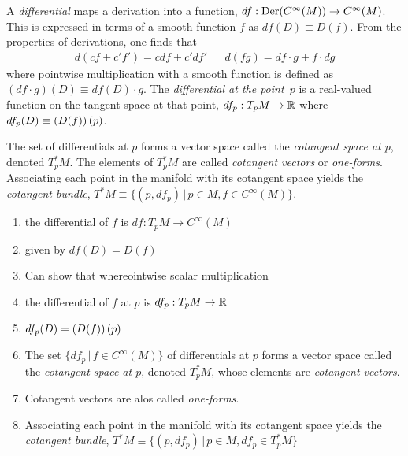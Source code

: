\documentclass[11pt]{article}
\numberwithin{equation}{section}
\begin{document}
\begin{dfn}
A \textit{differential} maps a derivation into a function, 
$
  df
:
  \mathrm{Der}(C^\infty(M))
\rightarrow
  C^\infty(M)
$.
This is expressed in terms of a smooth function $f$ as
$
  df(D)
\equiv
  D(f)
$.
From the properties of derivations, one finds that
\begin{align}
  d(cf + c'f')
=
  cdf
+
  c'df'
&&
  d(fg)
=
  df\cdot g
+
  f\cdot dg
\end{align}
where pointwise multiplication with a smooth function is defined as
$
  (df\cdot g)(D)
\equiv
  df(D)\cdot g
$.
The \textit{differential at the point~$p$}
is a real-valued function on the tangent space at that point,
$
  df_p
:
  T_pM
\rightarrow
  \mathbb{R}
$
where
$
  df_p(D)
\equiv
  \left(D(f)\right)(p)
$.
\end{dfn}

\begin{dfn}
The set of differentials at $p$ forms a vector space called the \textit{cotangent space at $p$}, denoted
$
  T_p^*M
$.
The elements of $T_p^*M$ are called \textit{cotangent vectors} or \textit{one-forms}.
Associating each point in the manifold with its cotangent space yields the \textit{cotangent bundle},
$
  T^*M
\equiv
\{
  (p, df_p)
\,|\,
  p\in M,
  f\in C^\infty(M)
\}
$.
\end{dfn}




\begin{dfn}
\begin{enumerate}
\item
the differential of $f$ is
$
  df
:
  T_pM
\rightarrow
  C^\infty(M)
$
\item
given by
$
  df(D)
=
  D(f)
$

\item
Can show that
whereointwise scalar multiplication

\item
the differential of $f$ at $p$ is
$
  df_p
:
  T_pM
\rightarrow
  \mathbb{R}
$
\item
$
  df_p(D)
=
  \left(D(f)\right)(p)
$
\item
The set $\{df_p\,|\,f\in C^\infty(M)\}$ of differentials at $p$ forms a vector space called the \textit{cotangent space at $p$}, denoted $T_p^*M$, whose elements are \textit{cotangent vectors}.

\item
Cotangent vectors are alos called \textit{one-forms}.

\item
Associating each point in the manifold with its cotangent space yields the \textit{cotangent bundle},
$
  T^*M
\equiv
\{
  (p, df_p)
\,|\,
  p\in M,
  df_p\in T_p^*M
\}
$

\end{enumerate}
\end{dfn}
\end{document}
